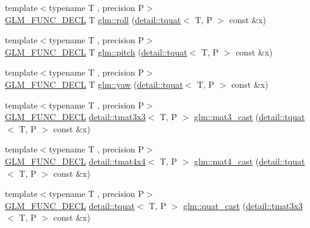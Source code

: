 \begin{DoxyCompactItemize}
\item 
{\footnotesize template$<$typename T , precision P$>$ }\\\hyperlink{setup_8hpp_ab2d052de21a70539923e9bcbf6e83a51}{G\+L\+M\+\_\+\+F\+U\+N\+C\+\_\+\+D\+E\+CL} T \hyperlink{group__gtc__quaternion_ga6d883e423bc425f4334fcce202131f7e}{glm\+::roll} (\hyperlink{structglm_1_1detail_1_1tquat}{detail\+::tquat}$<$ T, P $>$ const \&x)
\item 
{\footnotesize template$<$typename T , precision P$>$ }\\\hyperlink{setup_8hpp_ab2d052de21a70539923e9bcbf6e83a51}{G\+L\+M\+\_\+\+F\+U\+N\+C\+\_\+\+D\+E\+CL} T \hyperlink{group__gtc__quaternion_ga4d345dc369a54f53f5ebc375bac56d11}{glm\+::pitch} (\hyperlink{structglm_1_1detail_1_1tquat}{detail\+::tquat}$<$ T, P $>$ const \&x)
\item 
{\footnotesize template$<$typename T , precision P$>$ }\\\hyperlink{setup_8hpp_ab2d052de21a70539923e9bcbf6e83a51}{G\+L\+M\+\_\+\+F\+U\+N\+C\+\_\+\+D\+E\+CL} T \hyperlink{group__gtc__quaternion_ga1de7653ddf380ff06d2300eea831664c}{glm\+::yaw} (\hyperlink{structglm_1_1detail_1_1tquat}{detail\+::tquat}$<$ T, P $>$ const \&x)
\item 
{\footnotesize template$<$typename T , precision P$>$ }\\\hyperlink{setup_8hpp_ab2d052de21a70539923e9bcbf6e83a51}{G\+L\+M\+\_\+\+F\+U\+N\+C\+\_\+\+D\+E\+CL} \hyperlink{structglm_1_1detail_1_1tmat3x3}{detail\+::tmat3x3}$<$ T, P $>$ \hyperlink{group__gtc__quaternion_ga65257c3494022ad80a50ce11da95049d}{glm\+::mat3\+\_\+cast} (\hyperlink{structglm_1_1detail_1_1tquat}{detail\+::tquat}$<$ T, P $>$ const \&x)
\item 
{\footnotesize template$<$typename T , precision P$>$ }\\\hyperlink{setup_8hpp_ab2d052de21a70539923e9bcbf6e83a51}{G\+L\+M\+\_\+\+F\+U\+N\+C\+\_\+\+D\+E\+CL} \hyperlink{structglm_1_1detail_1_1tmat4x4}{detail\+::tmat4x4}$<$ T, P $>$ \hyperlink{group__gtc__quaternion_gafc4e34c836f7ccb5f3bb2a0373c831e0}{glm\+::mat4\+\_\+cast} (\hyperlink{structglm_1_1detail_1_1tquat}{detail\+::tquat}$<$ T, P $>$ const \&x)
\item 
{\footnotesize template$<$typename T , precision P$>$ }\\\hyperlink{setup_8hpp_ab2d052de21a70539923e9bcbf6e83a51}{G\+L\+M\+\_\+\+F\+U\+N\+C\+\_\+\+D\+E\+CL} \hyperlink{structglm_1_1detail_1_1tquat}{detail\+::tquat}$<$ T, P $>$ \hyperlink{group__gtc__quaternion_gafb826745dedb1760100bbd25d0f63fde}{glm\+::quat\+\_\+cast} (\hyperlink{structglm_1_1detail_1_1tmat3x3}{detail\+::tmat3x3}$<$ T, P $>$ const \&x)

\end{DoxyCompactItemize}
